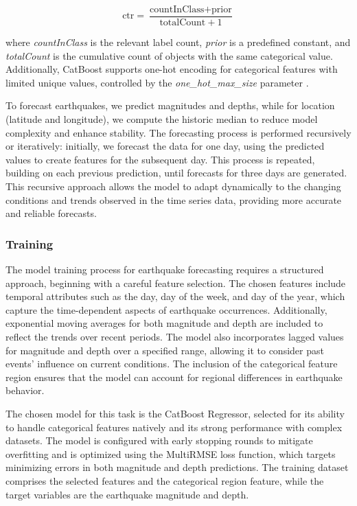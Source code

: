 \[\text{ctr} = \frac{\text{countInClass} + \text{prior}}{\text{totalCount} + 1}\]

where \textit{countInClass} is the relevant label count, \textit{prior} is a predefined constant, and \textit{totalCount} is the cumulative count of objects with the same categorical value. Additionally, CatBoost supports one-hot encoding for categorical features with limited unique values, controlled by the \textit{one\_hot\_max\_size} parameter \parencite{catboost-encoding}.

To forecast earthquakes, we predict magnitudes and depths, while for location (latitude and longitude), we compute the historic median to reduce model complexity and enhance stability. The forecasting process is performed recursively or iteratively: initially, we forecast the data for one day, using the predicted values to create features for the subsequent day. This process is repeated, building on each previous prediction, until forecasts for three days are generated. This recursive approach allows the model to adapt dynamically to the changing conditions and trends observed in the time series data, providing more accurate and reliable forecasts.

\subsubsection{Training}
The model training process for earthquake forecasting requires a structured approach, beginning with a careful feature selection. The chosen features include temporal attributes such as the day, day of the week, and day of the year, which capture the time-dependent aspects of earthquake occurrences. Additionally, exponential moving averages for both magnitude and depth are included to reflect the trends over recent periods. The model also incorporates lagged values for magnitude and depth over a specified range, allowing it to consider past events' influence on current conditions. The inclusion of the categorical feature region ensures that the model can account for regional differences in earthquake behavior.

The chosen model for this task is the CatBoost Regressor, selected for its ability to handle categorical features natively and its strong performance with complex datasets. The model is configured with early stopping rounds to mitigate overfitting and is optimized using the MultiRMSE loss function, which targets minimizing errors in both magnitude and depth predictions. The training dataset comprises the selected features and the categorical region feature, while the target variables are the earthquake magnitude and depth.


